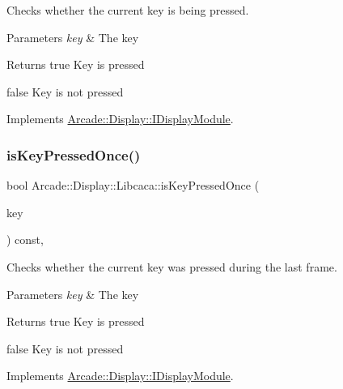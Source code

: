 Checks whether the current key is being pressed. 


\begin{DoxyParams}{Parameters}
{\em key} & The key \\
\hline
\end{DoxyParams}
\begin{DoxyReturn}{Returns}
true Key is pressed 

false Key is not pressed 
\end{DoxyReturn}


Implements \mbox{\hyperlink{classArcade_1_1Display_1_1IDisplayModule_af871661ff84c21581cd7233ba6f27aa0}{Arcade\+::\+Display\+::\+I\+Display\+Module}}.

\mbox{\label{classArcade_1_1Display_1_1Libcaca_a2de2c9cd935fbee371fa5215bd45c137}} 
\subsubsection{\texorpdfstring{isKeyPressedOnce()}{isKeyPressedOnce()}}
{\footnotesize\ttfamily bool Arcade\+::\+Display\+::\+Libcaca\+::is\+Key\+Pressed\+Once (\begin{DoxyParamCaption}\item[{\mbox{\hyperlink{classArcade_1_1Display_1_1IDisplayModule_a8da3f6b309ca0581473ae8cc8789b619}{I\+Display\+Module\+::\+Keys}}}]{key }\end{DoxyParamCaption}) const\hspace{0.3cm}{\ttfamily [final]}, {\ttfamily [virtual]}}



Checks whether the current key was pressed during the last frame. 


\begin{DoxyParams}{Parameters}
{\em key} & The key \\
\hline
\end{DoxyParams}
\begin{DoxyReturn}{Returns}
true Key is pressed 

false Key is not pressed 
\end{DoxyReturn}


Implements \mbox{\hyperlink{classArcade_1_1Display_1_1IDisplayModule_a531b700b332e077d9b714bafac05ebe1}{Arcade\+::\+Display\+::\+I\+Display\+Module}}.

